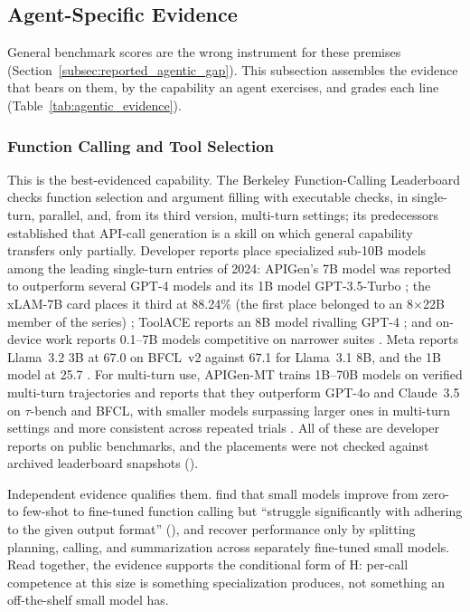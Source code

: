 \subsection{Agent-Specific Evidence}
\label{subsec:agentic_evidence}

General benchmark scores are the wrong instrument for these premises (Section~\ref{subsec:reported_agentic_gap}). This subsection assembles the evidence that bears on them, by the capability an agent exercises, and grades each line (Table~\ref{tab:agentic_evidence}).

\subsubsection{Function Calling and Tool Selection}
\label{subsubsec:agentic_ev_fc}

This is the best-evidenced capability. The Berkeley Function-Calling Leaderboard \citep{patil2025bfcl} checks function selection and argument filling with executable checks, in single-turn, parallel, and, from its third version, multi-turn settings; its predecessors \citep{patil2023gorilla,qin2024toolllm,li2023apibank} established that API-call generation is a skill on which general capability transfers only partially. Developer reports place specialized sub-10B models among the leading single-turn entries of 2024: APIGen's 7B model was reported to outperform several GPT-4 models and its 1B model GPT-3.5-Turbo \citep{liu2024apigen}; the xLAM-7B card places it third at 88.24\% (the first place belonged to an 8$\times$22B member of the series) \citep{zhang2024xlam}; ToolACE reports an 8B model rivalling GPT-4 \citep{liu2025toolace}; and on-device work reports 0.1--7B models competitive on narrower suites \citep{chen2024octopusv2,erdogan2024tinyagent,lin2024hammer,liu2024mobilellm}. Meta reports Llama~3.2 3B at 67.0 on BFCL~v2 against 67.1 for Llama~3.1 8B, and the 1B model at 25.7 \citep{meta2024llama32card}. For multi-turn use, APIGen-MT trains 1B--70B models on verified multi-turn trajectories and reports that they outperform GPT-4o and Claude~3.5 on $\tau$-bench and BFCL, with smaller models surpassing larger ones in multi-turn settings and more consistent across repeated trials \citep{prabhakar2025apigenmt}. All of these are developer reports on public benchmarks, and the placements were not checked against archived leaderboard snapshots (\evC).

Independent evidence qualifies them. \citet{kavathekar2025smallmodels} find that small models improve from zero- to few-shot to fine-tuned function calling but ``struggle significantly with adhering to the given output format'' (\evB), and \citet{shen2024weaktool} recover performance only by splitting planning, calling, and summarization across separately fine-tuned small models. Read together, the evidence supports the conditional form of H: per-call competence at this size is something specialization produces, not something an off-the-shelf small model has.

